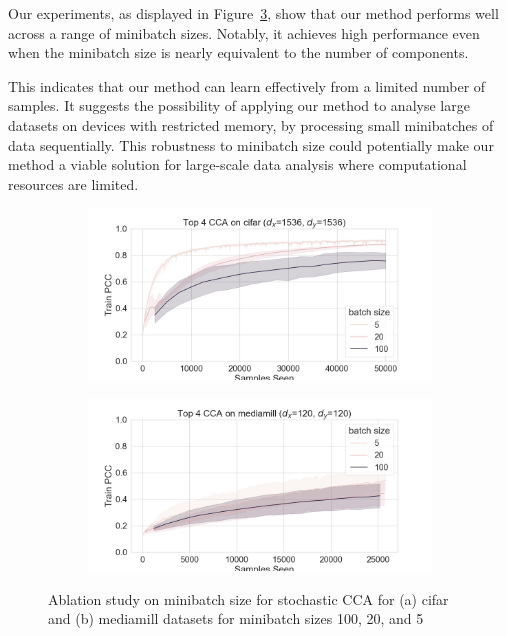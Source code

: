 Our experiments, as displayed in Figure~\ref{fig:minibatch size ablation}, show that our method performs well across a range of minibatch sizes. Notably, it achieves high performance even when the minibatch size is nearly equivalent to the number of components.

This indicates that our method can learn effectively from a limited number of samples. It suggests the possibility of applying our method to analyse large datasets on devices with restricted memory, by processing small minibatches of data sequentially. This robustness to minibatch size could potentially make our method a viable solution for large-scale data analysis where computational resources are limited.

\begin{figure}[h]
    \centering
    \begin{subfigure}[b]{0.49\textwidth}
        \centering
        \includegraphics[width=\textwidth]{figures/gradient_descent/CCA/cifar_minibatch_size_ablation.png}
        \caption{}
        \label{fig:cifar_minibatch_ablation}
    \end{subfigure}
    \begin{subfigure}[b]{0.49\textwidth}
        \centering
        \includegraphics[width=\textwidth]{figures/gradient_descent/CCA/mediamill_minibatch_size_ablation.png}
        \caption{}
        \label{fig:mediamill_minibatch_ablation}
    \end{subfigure}
    \caption{Ablation study on minibatch size for stochastic CCA for (a) cifar and (b) mediamill datasets for minibatch sizes 100, 20, and 5}
    \label{fig:minibatch size ablation}
\end{figure}

